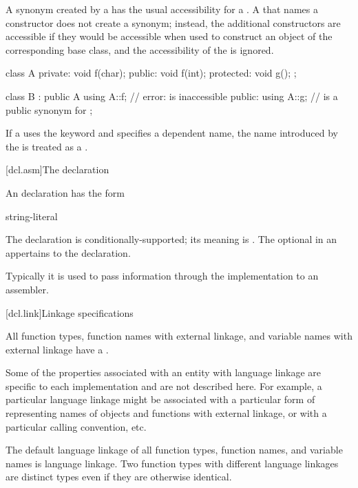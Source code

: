 \pnum
A synonym created by a  has the usual
accessibility for a .
A  that names a constructor does not
create a synonym; instead, the additional constructors
are accessible if they would be accessible
when used to construct an object of the corresponding base class,
and the accessibility of the  is ignored.
\begin{example}
\begin{codeblock}
class A {
private:
    void f(char);
public:
    void f(int);
protected:
    void g();
};

class B : public A {
  using A::f;       // error:  is inaccessible
public:
  using A::g;       //  is a public synonym for 
};
\end{codeblock}
\end{example}

\pnum
If a  uses the keyword  and
specifies a dependent name, the name introduced by the
 is treated as a
.%

[dcl.asm]{The  declaration}%
%
%

\pnum
An  declaration has the form
\begin{bnf}
\br
      \terminal{(} string-literal \terminal{)} \terminal{;}
\end{bnf}

The  declaration is conditionally-supported; its meaning is
.
The optional  in
an  appertains to the  declaration.
\begin{note}
Typically it is used to pass information through the implementation to
an assembler.
\end{note}

[dcl.link]{Linkage specifications}%

\pnum
All function types, function names with external linkage, and variable
names with external linkage have a .
\begin{note}
Some of the properties associated with an entity with language linkage
are specific to each implementation and are not described here. For
example, a particular language linkage might be associated with a
particular form of representing names of objects and functions with
external linkage, or with a particular calling convention, etc.
\end{note}
The default language linkage of all function types, function names, and
variable names is \Cpp{} language linkage. Two function types with
different language linkages are distinct types even if they are
otherwise identical.

